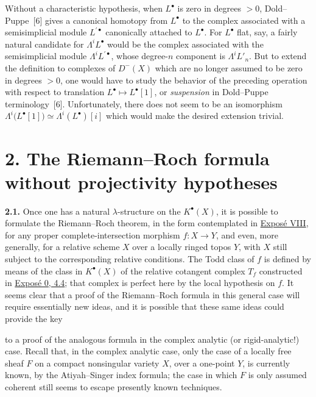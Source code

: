 Without a characteristic hypothesis, when $L^\bullet$ is zero in degrees $>0$, Dold--Puppe~[6] gives a canonical homotopy from $L^\bullet$ to the complex associated with a semisimplicial module $L^{\prime\bullet}$ canonically attached to $L^\bullet$. For $L^\bullet$ flat, say, a fairly natural candidate for $\Lambda^iL^\bullet$ would be the complex associated with the semisimplicial module $\Lambda^iL^{\prime\bullet}$, whose degree-$n$ component is $\Lambda^iL'_n$. But to extend the definition to complexes of $D^-(X)$ which are no longer assumed to be zero in degrees $>0$, one would have to study the behavior of the preceding operation with respect to translation $L^\bullet\mapsto L^\bullet[1]$, or \emph{suspension} in Dold--Puppe terminology~[6]. Unfortunately, there does not seem to be an isomorphism $\Lambda^i\bigl(L^\bullet[1]\bigr)\simeq\Lambda^i(L^\bullet)[i]$ which would make the desired extension trivial.

\section*{2. The Riemann--Roch formula without projectivity hypotheses}

\textbf{2.1.} Once one has a natural $\lambda$-structure on the $K^\bullet(X)$, it is possible to formulate the Riemann--Roch theorem, in the form contemplated in \hyperlink{sga6.e08.expose}{Expos\'e VIII}, for any proper complete-intersection morphism $f:X\to Y$, and even, more generally, for a relative scheme $X$ over a locally ringed topos $Y$, with $X$ still subject to the corresponding relative conditions. The Todd class of $f$ is defined by means of the class in $K^\bullet(X)$ of the relative cotangent complex $T_f$ constructed in \hyperlink{sga6.e00.sec.4.4}{Expos\'e 0, 4.4}; that complex is perfect here by the local hypothesis on $f$. It seems clear that a proof of the Riemann--Roch formula in this general case will require essentially new ideas, and it is possible that these same ideas could provide the key

to a proof of the analogous formula in the complex analytic (or rigid-analytic!) case. Recall that, in the complex analytic case, only the case of a locally free sheaf $F$ on a compact nonsingular variety $X$, over a one-point $Y$, is currently known, by the Atiyah--Singer index formula; the case in which $F$ is only assumed coherent still seems to escape presently known techniques.

